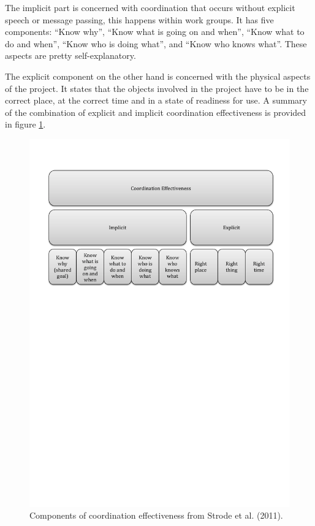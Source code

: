 The implicit part is concerned with coordination that occurs without explicit speech or message passing, this happens within work groups. It has five components: ``Know why'', ``Know what is going on and when'', ``Know what to do and when'', ``Know who is doing what'', and ``Know who knows what''. These aspects are pretty self-explanatory.

The explicit component on the other hand is concerned with the physical aspects of the project. It states that the objects involved in the project have to be in the correct place, at the correct time and in a state of readiness for use. A summary of the combination of explicit and implicit coordination effectiveness is provided in figure \ref{effectiveness}.

\begin{figure}[H]
\centering
\includegraphics[trim=0cm 17.5cm 0cm 1.5cm, width=160mm]{images/Coordination_Effectiveness.pdf}
\caption{Components of coordination effectiveness from Strode et al. (2011).}
\label{effectiveness}
\end{figure}

